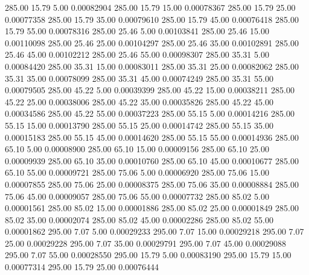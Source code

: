     285.00     15.79      5.00     0.00082904
    285.00     15.79     15.00     0.00078367
    285.00     15.79     25.00     0.00077358
    285.00     15.79     35.00     0.00079610
    285.00     15.79     45.00     0.00076418
    285.00     15.79     55.00     0.00078316
    285.00     25.46      5.00     0.00103841
    285.00     25.46     15.00     0.00110098
    285.00     25.46     25.00     0.00104297
    285.00     25.46     35.00     0.00102891
    285.00     25.46     45.00     0.00102212
    285.00     25.46     55.00     0.00098307
    285.00     35.31      5.00     0.00084420
    285.00     35.31     15.00     0.00083011
    285.00     35.31     25.00     0.00082062
    285.00     35.31     35.00     0.00078099
    285.00     35.31     45.00     0.00074249
    285.00     35.31     55.00     0.00079505
    285.00     45.22      5.00     0.00039399
    285.00     45.22     15.00     0.00038211
    285.00     45.22     25.00     0.00038006
    285.00     45.22     35.00     0.00035826
    285.00     45.22     45.00     0.00034586
    285.00     45.22     55.00     0.00037223
    285.00     55.15      5.00     0.00014216
    285.00     55.15     15.00     0.00013790
    285.00     55.15     25.00     0.00014742
    285.00     55.15     35.00     0.00015183
    285.00     55.15     45.00     0.00014620
    285.00     55.15     55.00     0.00014936
    285.00     65.10      5.00     0.00008900
    285.00     65.10     15.00     0.00009156
    285.00     65.10     25.00     0.00009939
    285.00     65.10     35.00     0.00010760
    285.00     65.10     45.00     0.00010677
    285.00     65.10     55.00     0.00009721
    285.00     75.06      5.00     0.00006920
    285.00     75.06     15.00     0.00007855
    285.00     75.06     25.00     0.00008375
    285.00     75.06     35.00     0.00008884
    285.00     75.06     45.00     0.00009057
    285.00     75.06     55.00     0.00007732
    285.00     85.02      5.00     0.00001561
    285.00     85.02     15.00     0.00001886
    285.00     85.02     25.00     0.00001849
    285.00     85.02     35.00     0.00002074
    285.00     85.02     45.00     0.00002286
    285.00     85.02     55.00     0.00001862
    295.00      7.07      5.00     0.00029233
    295.00      7.07     15.00     0.00029218
    295.00      7.07     25.00     0.00029228
    295.00      7.07     35.00     0.00029791
    295.00      7.07     45.00     0.00029088
    295.00      7.07     55.00     0.00028550
    295.00     15.79      5.00     0.00083190
    295.00     15.79     15.00     0.00077314
    295.00     15.79     25.00     0.00076444
